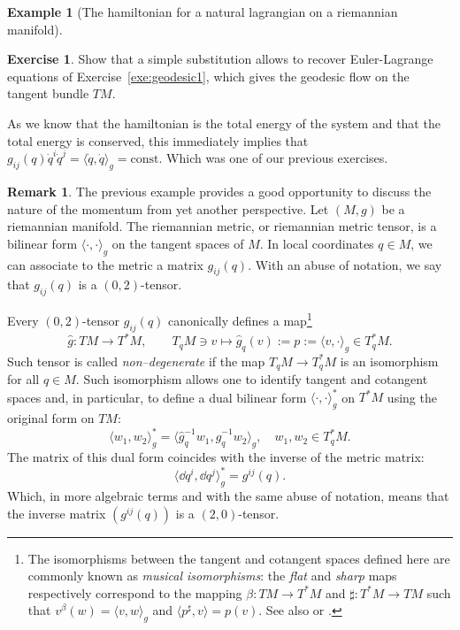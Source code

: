 \documentclass[english,fontsize=11pt,paper=b5]{scrbook}
\numberwithin{equation}{chapter}
\theoremstyle{definition}
\newtheorem{remark}{Remark}[chapter]
\newtheorem{example}{Example}[chapter]
\newtheorem{exercise}{Exercise}[chapter]
\begin{document}
\begin{example}[The hamiltonian for a natural lagrangian on a riemannian manifold]
      \begin{exercise}
        Show that a simple substitution allows to recover Euler-Lagrange equations of Exercise~\ref{exe:geodesic1}, which gives the geodesic flow on the tangent bundle $TM$.
      \end{exercise}

      As we know that the hamiltonian is the total energy of the system and that the total energy is conserved, this immediately implies that $g_{ij}(q) \dot q^i \dot q^j = \langle\dot q, \dot q\rangle_g = \mathrm{const}$.
      Which was one of our previous exercises.
    \end{example}

    \begin{remark}\label{rem:ptocot}
      The previous example provides a good opportunity to discuss the nature of the momentum from yet another perspective.
      Let $(M, g)$ be a riemannian manifold.
      The riemannian metric, or riemannian metric tensor, is a bilinear form $\langle\cdot, \cdot\rangle_g$ on the tangent spaces of $M$.
      In local coordinates $q\in M$, we can associate to the metric a matrix $g_{ij}(q)$.
      With an abuse of notation, we say that $g_{ij}(q)$ is a $(0,2)$-tensor.

      Every $(0,2)$-tensor $g_{ij}(q)$ canonically defines a map\footnote{The isomorphisms between the tangent and cotangent spaces defined here are commonly known as \emph{musical isomorphisms}: the \emph{flat} and \emph{sharp} maps respectively correspond to the mapping $\beta:TM\to T^*M$ and $\sharp:T^*M\to TM$ such that $v^\beta(w) = \langle v,w\rangle_g$ and $\langle p^\sharp, v\rangle = p(v)$.
      See also \cite[Chapter 11]{book:lee} or \cite[Example 6.1.9]{lectures:aom:seri}.}
      \begin{equation}
        \hat g: TM \to T^*M, \qquad T_q M \ni v \mapsto \hat g_q(v) := p := \langle v, \cdot\rangle_g \in T^*_q M.
      \end{equation}
      Such tensor is called \emph{non--degenerate} if the map $T_qM \to T_q^* M$ is an isomorphism for all $q\in M$.
      Such isomorphism allows one to identify tangent and cotangent spaces and, in particular, to define a dual bilinear form $\langle\cdot, \cdot\rangle_g^*$ on $T^*M$ using the original form on $TM$:
      \begin{equation}
        \langle w_1, w_2\rangle_g^* = \langle\hat g_q^{-1} w_1, \hat g_q^{-1} w_2\rangle_g, \quad w_1,w_2 \in T^*_q M.
      \end{equation}
      The matrix of this dual form coincides with the inverse of the metric matrix:
      \begin{equation}
        \langle\dd q^i, \dd q^j\rangle_g^* = g^{ij}(q).
      \end{equation}
      Which, in more algebraic terms and with the same abuse of notation, means that the inverse matrix $(g^{ij}(q))$ is a $(2,0)$-tensor.



\end{remark}
\end{document}
